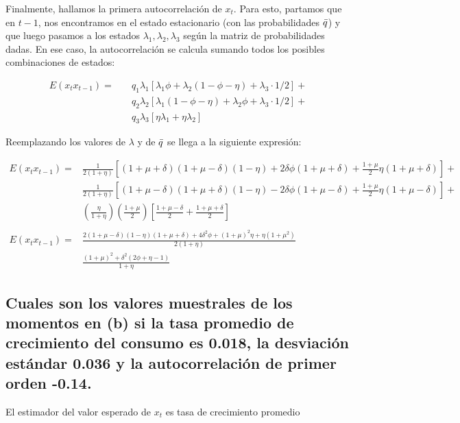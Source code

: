 \documentclass[12pt]{article}
\begin{document}
Finalmente, hallamos la primera autocorrelación de $x_t$. Para esto, partamos que en $t-1$, nos encontramos en el estado estacionario (con las probabilidades $\Bar{q}$) y que luego pasamos a los estados $\lambda_1, \lambda_2, \lambda_3$ según la matriz de probabilidades dadas. En ese caso, la autocorrelación se calcula sumando todos los posibles combinaciones de estados:

\begin{align*}
        E(x_t x_{t-1}) = \quad &q_1 \lambda_1 [\lambda_1\phi + \lambda_2(1-\phi-\eta)+\lambda_3\cdot 1/2] + \\
                    & q_2 \lambda_2[\lambda_1 (1-\phi-\eta) + \lambda_2\phi + \lambda_3 \cdot 1/2] + \\
                    & q_3 \lambda_3 [\eta \lambda_1 + \eta \lambda_2]
\end{align*}

Reemplazando los valores de $\lambda$ y de $\Bar{q}$ se llega a la siguiente expresión:

\begin{align*}
        E(x_t x_{t-1}) = &\frac{1}{2(1+\eta)}\left [(1+\mu+\delta)(1+\mu-\delta)(1-\eta)+2\delta\phi(1+\mu+\delta)+\frac{1+\mu}{2}\eta(1+\mu+\delta) \right ]  + \\
                    &\frac{1}{2(1+\eta)} \left [(1+\mu-\delta)(1+\mu+\delta)(1-\eta)-2\delta\phi(1+\mu-\delta)+\frac{1+\mu}{2}\eta(1+\mu-\delta) \right ] + \\
                    & \left ( \frac{\eta}{1+\eta}\right ) \left (\frac{1+\mu}{2}\right ) \left [ \frac{1+\mu-\delta}{2} + \frac{1+\mu+\delta}{2} \right ] \\
                    &\\
         E(x_t x_{t-1}) = &\frac{2(1+\mu-\delta)(1-\eta)(1+\mu+\delta)+4\delta^2\phi+(1+\mu)^2\eta+\eta(1+\mu^2)}{2(1+\eta)}     \\
                          &\frac{(1+\mu)^2+\delta^2(2\phi+\eta-1)}{1+\eta}
\end{align*}

\subsection{Cuales son los valores muestrales de los momentos en (b) si la tasa promedio de crecimiento del consumo es 0.018, la desviación estándar 0.036 y la autocorrelación de primer orden -0.14.}

El estimador del valor esperado de $x_t$ es tasa de crecimiento promedio
\end{document}
